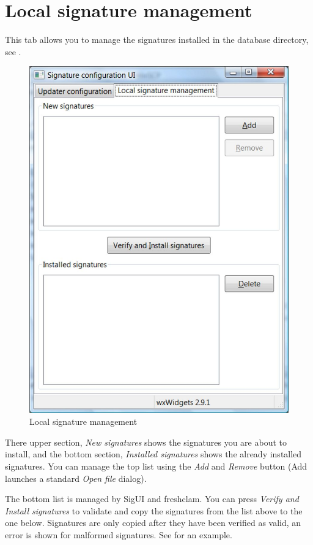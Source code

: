 \section{Local signature management}
This tab allows you to manage the signatures installed in the database directory, see .

\begin{figure}[htb]
\centering
\includegraphics{sigui_tab2.jpg}
\caption{Local signature management}
\label{fig:tab2}
\end{figure}

There upper section, \emph{New signatures} shows the signatures you are about to install,
and the bottom section, \emph{Installed signatures} shows the already installed signatures.
You can manage the top list using the \emph{Add} and \emph{Remove} button (Add launches a standard \emph{Open file} dialog).

The bottom list is managed by SigUI and \gls{freshclam}. You can press \emph{Verify and Install signatures} to validate and copy the signatures from the list above to the one below.
Signatures are only copied after they have been verified as valid, an error is shown for malformed signatures. See  for an example.


